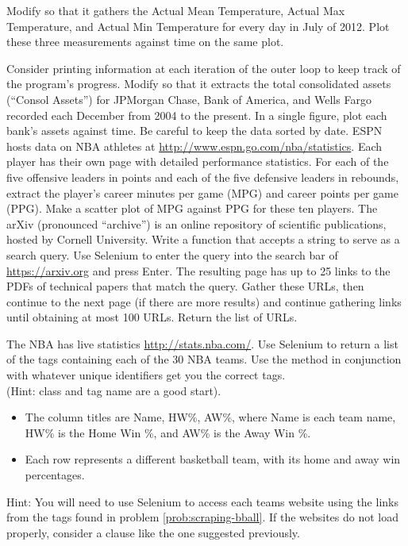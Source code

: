 Modify  so that it gathers the Actual Mean Temperature, Actual Max Temperature, and Actual Min Temperature for every day in July of 2012.
Plot these three measurements against time on the same plot.

Consider printing information at each iteration of the outer loop to keep track of the program's progress.
Modify  so that it extracts the total consolidated assets (``Consol Assets'') for JPMorgan Chase, Bank of America, and Wells Fargo recorded each December from 2004 to the present.
In a single figure, plot each bank's assets against time.
Be careful to keep the data sorted by date.
ESPN hosts data on NBA athletes at \url{http://www.espn.go.com/nba/statistics}.
Each player has their own page with detailed performance statistics.
For each of the five offensive leaders in points and each of the five defensive leaders in rebounds, extract the player's career minutes per game (MPG) and career points per game (PPG).
Make a scatter plot of MPG against PPG for these ten players.
The arXiv (pronounced ``archive'') is an online repository of scientific publications, hosted by Cornell University.
Write a function that accepts a string to serve as a search query.
Use Selenium to enter the query into the search bar of \url{https://arxiv.org} and press Enter.
The resulting page has up to 25 links to the PDFs of technical papers that match the query.
Gather these URLs, then continue to the next page (if there are more results) and continue gathering links until obtaining at most 100 URLs.
Return the list of URLs.

The NBA has live statistics \url{http://stats.nba.com/}.
Use Selenium to return a list of the  tags containing each of the 30 NBA teams.
Use the  method in conjunction with whatever unique identifiers get you the correct tags.
\\(Hint: class and tag name are a good start). %

\begin{itemize}
\item The column titles are Name, HW\%, AW\%, where Name is each team name, HW\% is the Home Win \%, and AW\% is the Away Win \%.
\item Each row represents a different basketball team, with its home and away win percentages.
\end{itemize}
Hint: You will need to use Selenium to access each teams website using the links from the tags found in problem \ref{prob:scraping-bball}.
If the websites do not load properly, consider a  clause like the one suggested previously.

